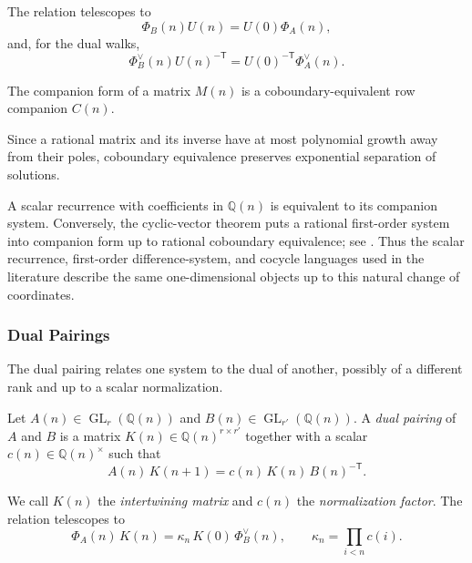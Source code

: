 \documentclass[oneside,english,11pt]{amsart}
\begin{document}
The relation telescopes to
\[
    \Phi_B(n)U(n)=U(0)\Phi_A(n),
\]
and, for the dual walks,
\[
    \Phi_B^\vee(n)U(n)^{-\mathsf T}
    =
    U(0)^{-\mathsf T}\Phi_A^\vee(n).
\]
\begin{defn}
    \label{def: companion form}
    The companion form of a matrix $M(n)$ is a coboundary-equivalent row companion $C(n)$.
\end{defn}

Since a rational matrix and its inverse have at most polynomial growth
away from their poles, coboundary equivalence preserves exponential
separation of solutions.

A scalar recurrence with coefficients in $\mathbb Q(n)$ is equivalent
to its companion system.  Conversely, the cyclic-vector theorem puts a
rational first-order system into companion form up to rational
coboundary equivalence; see
\cite[Theorem~B.2]{hendriksSinger1999}. Thus the scalar recurrence,
first-order difference-system, and cocycle languages used in the
literature describe the same one-dimensional objects up to this natural
change of coordinates.

\subsubsection{Dual Pairings}
\label{subsec:dual-pairing-prelim}

The dual pairing relates one system to the dual of another, possibly of a different rank and up to a scalar normalization.

\begin{defn}\label{def:dual-pairing}
Let $A(n)\in\operatorname{GL}_r(\mathbb Q(n))$ and $B(n)\in\operatorname{GL}_{r'}(\mathbb Q(n))$. A \emph{dual pairing} of $A$ and $B$ is a matrix $K(n)\in\mathbb Q(n)^{r\times r'}$ together with a scalar $c(n)\in\mathbb Q(n)^\times$ such that
\[
  A(n)\,K(n+1)=c(n)\,K(n)\,B(n)^{-\mathsf T}.
\]
\end{defn}
We call $K(n)$ the \emph{intertwining matrix} and $c(n)$ the
\emph{normalization factor}. The relation telescopes to
\begin{equation*}\label{eq:dual-pairing-walks}
\Phi_A(n)\,K(n)=\kappa_n\,K(0)\,\Phi_B^\vee(n),\qquad
  \kappa_n=\prod_{i<n}c(i).
\end{equation*}
\end{document}
